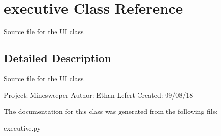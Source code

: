 \hypertarget{classexecutive}{}\section{executive Class Reference}
\label{classexecutive}


Source file for the UI class.  




\subsection{Detailed Description}
Source file for the UI class. 

Project\+: Minesweeper Author\+: Ethan Lefert Created\+: 09/08/18 

The documentation for this class was generated from the following file\+:\begin{DoxyCompactItemize}
\item 
executive.\+py\end{DoxyCompactItemize}

